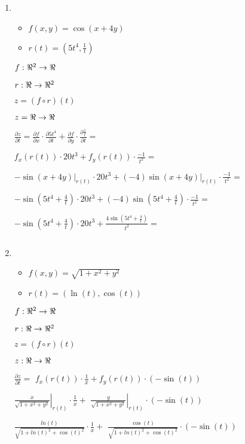 \documentclass[../practica_04.tex]{subfiles}
\begin{document}
\begin{enumerate}
        \item
            \begin{itemize}
                \item $ f(x,y) = \cos(x + 4y) $
                \item $ r(t) = (5t^4, \frac{1}{t}) $
            \end{itemize}

            $ f: \real^2 \to \real $

            $ r: \real \to \real^2 $

            $ z = (f \circ r)(t) $

            $ z = \real \to \real $

            $ \frac{\partial z}{\partial t} = \frac{\partial f}{\partial x} \cdot \frac{\partial 5t^4}{\partial t} +
            \frac{\partial f}{\partial y} \cdot \frac{\partial \frac{1}{t}}{\partial t} = $

            $ f_x(r(t)) \cdot 20t^3 + f_y(r(t)) \cdot \frac{-1}{t^2} = $

            $ \left. -\sin(x + 4y) \right|_{r(t)} \cdot 20t^3 + \left. (-4)\sin(x + 4y) \right|_{r(t)} \cdot \frac{-1}{t^2} =$

            $ -\sin(5t^4 + \frac{4}{t}) \cdot 20t^3 + (-4)\sin(5t^4 + \frac{4}{t}) \cdot \frac{-1}{t^2} =$

            $ -\sin(5t^4 + \frac{4}{t}) \cdot 20t^3 + \frac{4\sin(5t^4 + \frac{4}{t})}{t^2} =$

            $ $

        \item
            \begin{itemize}
                \item $ f(x,y) = \sqrt{1+x^2+y^2} $
                \item $ r(t) = (\ln(t), \cos(t)) $
            \end{itemize}

            $ f: \real^2 \to \real $

            $ r: \real \to \real^2 $

            $ z = (f \circ r)(t) $

            $ z: \real \to \real $

            $ \frac{\partial z}{\partial t} = $
            $ f_x(r(t)) \cdot \frac{1}{x} + f_y(r(t)) \cdot (-\sin(t)) $

            $ \left. \frac{x}{\sqrt{1 + x^2 + y^2}} \right|_{r(t)} \cdot \frac{1}{x} + $
            $ \left. \frac{y}{\sqrt{1 + x^2 + y^2}} \right|_{r(t)} \cdot (-\sin(t)) $

            $ \frac{ln(t)}{\sqrt{1 + ln(t)^2 + \cos(t)^2}} \cdot \frac{1}{x} + $
            $ \frac{\cos(t)}{\sqrt{1 + ln(t)^2 + \cos(t)^2}} \cdot (-\sin(t)) $

    \end{enumerate}
\end{document}

